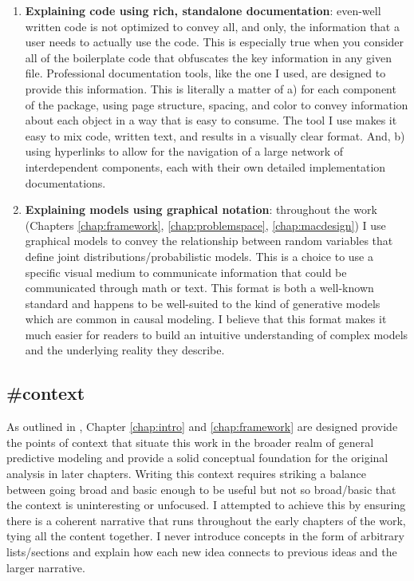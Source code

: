 \documentclass[./main.tex]{subfiles}
\begin{document}
\begin{enumerate}
    \item \textbf{Explaining code using rich, standalone documentation}: even-well written code is not optimized to convey all, and only, the information that a user needs to actually use the code. This is especially true when you consider all of the boilerplate code that obfuscates the key information in any given file. Professional documentation tools, like the one I used, are designed to provide this information. This is literally a matter of a) for each component of the package, using page structure, spacing, and color to convey information about each object in a way that is easy to consume. The tool I use makes it easy to mix code, written text, and results in a visually clear format. And, b) using hyperlinks to allow for the navigation of a large network of interdependent components, each with their own detailed implementation documentations. 
    
    \item \textbf{Explaining models using graphical notation}: throughout the work (Chapters \ref{chap:framework}, \ref{chap:problemspace}, \ref{chap:macdesign}) I use graphical models to convey the relationship between random variables that define joint distributions/probabilistic models. This is a choice to use a specific visual medium to communicate information that could be communicated through math or text. This format is both a well-known standard and happens to be well-suited to the kind of generative models which are common in causal modeling. I believe that this format makes it much easier for readers to build an intuitive understanding of complex models and the underlying reality they describe.
\end{enumerate}


\subsection{\textbf{\#context}}
\label{hc:context}

As outlined in , Chapter \ref{chap:intro} and \ref{chap:framework} are designed provide the points of context that situate this work in the broader realm of general predictive modeling and provide a solid conceptual foundation for the original analysis in later chapters. Writing this context requires striking a balance between going broad and basic enough to be useful but not so broad/basic that the context is uninteresting or unfocused. I attempted to achieve this by ensuring there is a coherent narrative that runs throughout the early chapters of the work, tying all the content together. I never introduce concepts in the form of arbitrary lists/sections and explain how each new idea connects to previous ideas and the larger narrative.
\end{document}
